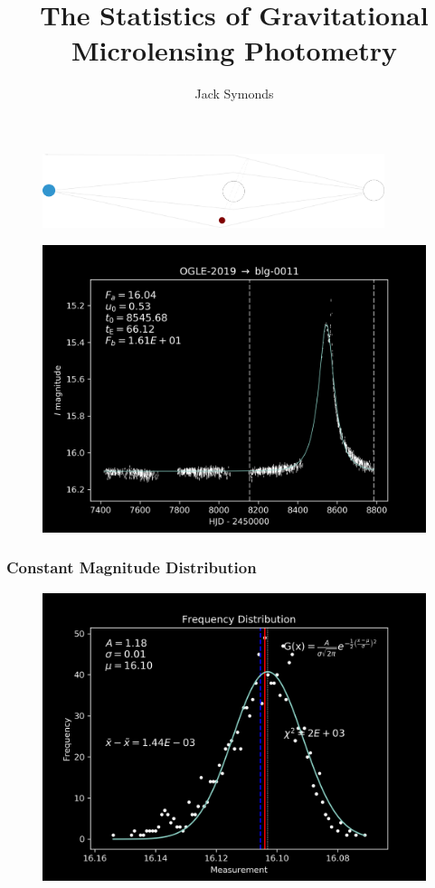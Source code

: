 \documentclass[9pt]{beamer}
\title{The Statistics of Gravitational Microlensing Photometry}
\author{Jack Symonds}
\date{}
\begin{document}
\begin{frame}
\maketitle
\begin{figure}[h]
\centering
\includegraphics[width=10cm]{intro}
\end{figure}
\end{frame}

\begin{frame}
\begin{figure}[h]
\centering
\includegraphics[width=\textwidth]{phot_dat}
\label{fig:phot_dat}
\end{figure}
\end{frame}


\begin{frame}
\frametitle{Constant Magnitude Distribution}
\begin{figure}[h]
\centering
\includegraphics[width=\textwidth]{freq_dist}
\label{fig:freq_dist}
\end{figure}
\end{frame}
\end{document}
